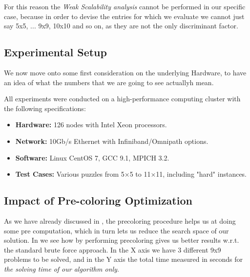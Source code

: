 For this reason the \textit{Weak Scalability analysis} cannot be performed in our specific case, because in order to devise the entries for which we evaluate we cannot just say 5x5, ... 9x9, 10x10 and so on, as they are not the only discriminant factor.

\subsection{Experimental Setup}
We now move onto some first consideration on the underlying Hardware, to have an idea of what the numbers that we are going to see actuallyh mean.

All experiments were conducted on a high-performance computing cluster with the following specifications:
\begin{itemize}
    \item \textbf{Hardware:} 126 nodes with Intel Xeon processors.
    \item \textbf{Network:} 10Gb/s Ethernet with Infiniband/Omnipath options.
    \item \textbf{Software:} Linux CentOS 7, GCC 9.1, MPICH 3.2.
    \item \textbf{Test Cases:} Various puzzles from 5×5 to 11×11, including "hard" instances.
\end{itemize}

\subsection{Impact of Pre-coloring Optimization}
\label{subsec:precoloring_performance}
As we have already discussed in , the precoloring procedure helps us at doing some pre computation, which in turn lets us reduce the search space of our solution. In  we see how by performing precoloring gives us better results w.r.t. the standard brute force approach. In the X axis we have 3 different 9x9 problems to be solved, and in the Y axis the total time measured in seconds for \textit{the solving time of our algorithm only}.

